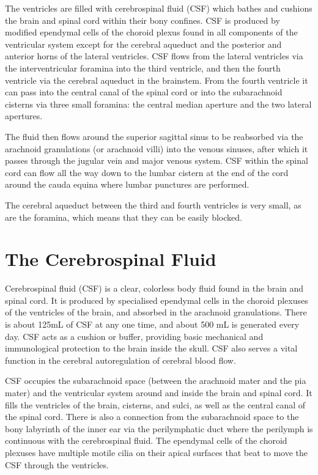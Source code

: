 \documentclass[]{book}
\begin{document}
The ventricles are filled with cerebrospinal fluid (CSF) which bathes and cushions the brain and spinal cord within their bony confines. CSF is produced by modified ependymal cells of the choroid plexus found in all components of the ventricular system except for the cerebral aqueduct and the posterior and anterior horns of the lateral ventricles. CSF flows from the lateral ventricles via the interventricular foramina into the third ventricle, and then the fourth ventricle via the cerebral aqueduct in the brainstem. From the fourth ventricle it can pass into the central canal of the spinal cord or into the subarachnoid cisterns via three small foramina: the central median aperture and the two lateral apertures.

The fluid then flows around the superior sagittal sinus to be reabsorbed via the arachnoid granulations (or arachnoid villi) into the venous sinuses, after which it passes through the jugular vein and major venous system. CSF within the spinal cord can flow all the way down to the lumbar cistern at the end of the cord around the cauda equina where lumbar punctures are performed.

The cerebral aqueduct between the third and fourth ventricles is very small, as are the foramina, which means that they can be easily blocked.

\hypertarget{the-cerebrospinal-fluid}{%
\section{The Cerebrospinal Fluid}\label{the-cerebrospinal-fluid}}

Cerebrospinal fluid (CSF) is a clear, colorless body fluid found in the brain and spinal cord. It is produced by specialised ependymal cells in the choroid plexuses of the ventricles of the brain, and absorbed in the arachnoid granulations. There is about 125mL of CSF at any one time, and about 500 mL is generated every day. CSF acts as a cushion or buffer, providing basic mechanical and immunological protection to the brain inside the skull. CSF also serves a vital function in the cerebral autoregulation of cerebral blood flow.

CSF occupies the subarachnoid space (between the arachnoid mater and the pia mater) and the ventricular system around and inside the brain and spinal cord. It fills the ventricles of the brain, cisterns, and sulci, as well as the central canal of the spinal cord. There is also a connection from the subarachnoid space to the bony labyrinth of the inner ear via the perilymphatic duct where the perilymph is continuous with the cerebrospinal fluid. The ependymal cells of the choroid plexuses have multiple motile cilia on their apical surfaces that beat to move the CSF through the ventricles.
\end{document}
